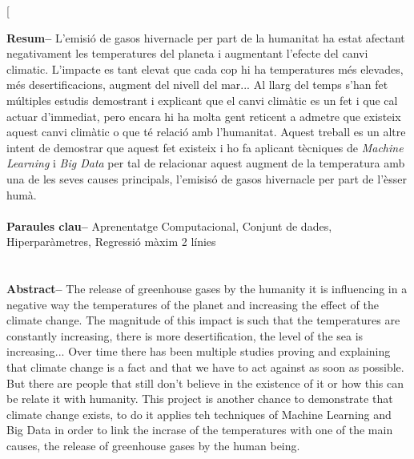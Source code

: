 \documentclass[10pt,a4paper,twocolumn,twoside]{article}
\begin{document}
\twocolumn[\begin{@twocolumnfalse}


\maketitle

\thispagestyle{primerapagina}
\begin{center}
\parbox{0.915\textwidth}
{\sffamily
\textbf{Resum--}
L'emisió de gasos hivernacle per part de la humanitat ha estat afectant negativament les temperatures del planeta i augmentant l'efecte del canvi climatic. L'impacte es tant elevat que cada cop hi ha temperatures més elevades, més desertificacions, augment del nivell del mar... Al llarg del temps s'han fet múltiples estudis demostrant i explicant que el canvi climàtic es un fet i que cal actuar d'immediat, pero encara hi ha molta gent reticent a admetre que existeix aquest canvi climàtic o que té relació amb l'humanitat. Aquest treball es un altre intent de demostrar que aquest fet existeix i ho fa aplicant tècniques de \textit{Machine Learning} i \textit{Big Data} per tal de relacionar aquest augment de la temperatura amb una de les seves causes principals, l'emisisó de gasos hivernacle per part de l'èsser humà.
\\
\\
\textbf{Paraules clau-- } Aprenentatge Computacional, Conjunt de dades, Hiperparàmetres, Regressió màxim 2 línies \\
\\
\bigskip
\\
\textbf{Abstract--} The release of greenhouse gases by the humanity it is influencing in a negative way the temperatures of the planet and increasing the effect of the climate change. The magnitude of this impact is such that the temperatures are constantly increasing, there is more desertification, the level of the sea is increasing... Over time there has been multiple studies proving and explaining that climate change is a fact and that we have to act against as soon as possible. But there are people that still don't believe in the existence of it or how this can be relate it with humanity. This project is another chance to demonstrate that climate change exists, to do it applies teh techniques of Machine Learning and Big Data in order to link the incrase of the temperatures with one of the main causes, the release of greenhouse gases by the human being.
}
\end{center}
\end{@twocolumnfalse}
\end{document}
